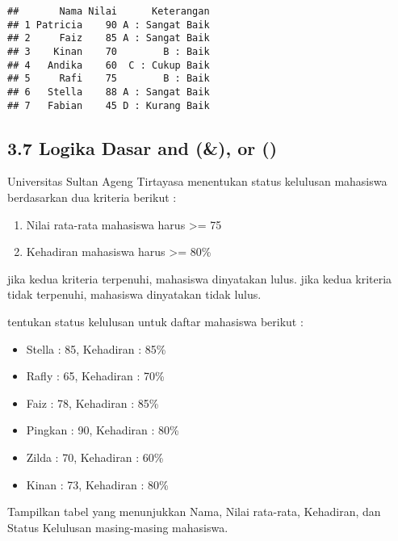 \documentclass[
]{article}
\providecommand{\tightlist}{%
  \setlength{\itemsep}{0pt}\setlength{\parskip}{0pt}}
\begin{document}
\begin{verbatim}
##       Nama Nilai      Keterangan
## 1 Patricia    90 A : Sangat Baik
## 2     Faiz    85 A : Sangat Baik
## 3    Kinan    70        B : Baik
## 4   Andika    60  C : Cukup Baik
## 5     Rafi    75        B : Baik
## 6   Stella    88 A : Sangat Baik
## 7   Fabian    45 D : Kurang Baik
\end{verbatim}

\subsection{3.7 Logika Dasar and (\&), or
(\textbar)}\label{logika-dasar-and-or}

Universitas Sultan Ageng Tirtayasa menentukan status kelulusan mahasiswa
berdasarkan dua kriteria berikut :

\begin{enumerate}
\def\labelenumi{\arabic{enumi}.}
\tightlist
\item
  Nilai rata-rata mahasiswa harus \textgreater= 75
\item
  Kehadiran mahasiswa harus \textgreater= 80\%
\end{enumerate}

jika kedua kriteria terpenuhi, mahasiswa dinyatakan lulus. jika kedua
kriteria tidak terpenuhi, mahasiswa dinyatakan tidak lulus.

tentukan status kelulusan untuk daftar mahasiswa berikut :

\begin{itemize}
\item
  Stella : 85, Kehadiran : 85\%
\item
  Rafly : 65, Kehadiran : 70\%
\item
  Faiz : 78, Kehadiran : 85\%
\item
  Pingkan : 90, Kehadiran : 80\%
\item
  Zilda : 70, Kehadiran : 60\%
\item
  Kinan : 73, Kehadiran : 80\%
\end{itemize}

Tampilkan tabel yang menunjukkan Nama, Nilai rata-rata, Kehadiran, dan
Status Kelulusan masing-masing mahasiswa.
\end{document}
